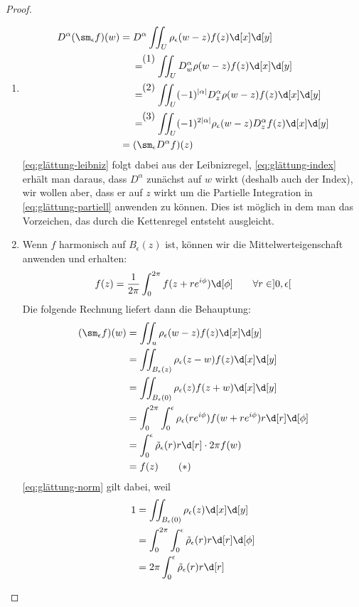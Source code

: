 \begin{proof}
  \begin{enumerate}
  \item
    \begin{align*}
      D^\alpha (\sm_\epsilon f)(w) & = D^\alpha \iint_U \rho_\epsilon(w
      - z) f(z) \d[x] \d[y] \\
      & \stackrel{\tag{1}}{=} \iint_U D_w^\alpha \rho(w - z) f(z)
      \d[x] \d[y] \label{eq:glättung-leibniz}\\
      & \stackrel{\tag{2}}{=} \iint_U (-1)^{|\alpha|} D_z^\alpha
      \rho(w-z) f(z) \d[x] \d[y] \label{eq:glättung-index}\\
      & \stackrel{\tag{3}}{=} \iint_U (-1)^{2|\alpha|}
      \rho_\epsilon(w-z) D^\alpha_z f(z)
      \d[x]\d[y] \label{eq:glättung-partiell}\\
      & = (\sm_\epsilon D^\alpha f)(z)
    \end{align*}
    \eqref{eq:glättung-leibniz} folgt dabei aus der Leibnizregel,
    \eqref{eq:glättung-index} erhält man daraus, dass $D^\alpha$
    zunächst auf $w$ wirkt (deshalb auch der Index), wir wollen aber,
    dass er auf $z$ wirkt um die Partielle Integration in
    \eqref{eq:glättung-partiell} anwenden zu können. Dies ist möglich
    in dem man das Vorzeichen, das durch die Kettenregel entsteht
    ausgleicht.
  \item Wenn $f$ harmonisch auf $B_\epsilon(z)$ ist, können wir die
    Mittelwerteigenschaft anwenden und erhalten:
    \[
    f(z) = \frac{1}{2\pi} \int_0^{2\pi}f(z + re^{i\phi}) \d[\phi]
    \qquad \forall r \in ]0, \epsilon[
    \]
    Die folgende Rechnung liefert dann die Behauptung:
    \begin{align*}
      (\sm_\epsilon f)(w) & = \iint_u \rho_\epsilon(w- z) f(z)
      \d[x]\d[y] \\
      & = \iint_{B_\epsilon(z)} \rho_\epsilon(z -w ) f(z) \d[x]\d[y]
      \\
      & = \iint_{B_\epsilon(0)} \rho_\epsilon(z) f(z + w) \d[x]\d[y]
      \\
      & = \int_0^{2\pi} \int_0^\epsilon \rho_\epsilon(re^{i\phi}) f(w +
       re^{i\phi}) r \d[r] \d[\phi] \\
      & = \int_0^\epsilon \tilde \rho_\epsilon(r) r\d[r] \cdot 2 \pi f(w) \\
      & = f(z) \label{eq:glättung-norm} \tag{$\ast$}
    \end{align*}
    \eqref{eq:glättung-norm} gilt dabei, weil
    \begin{align*}
      1 & = \iint_{B_\epsilon(0)}\rho_\epsilon(z) \d[x]\d[y] \\
      & = \int_0^{2\pi}\int_0^{\epsilon} \tilde \rho_\epsilon(r) r
      \d[r] \d[\phi] \\
      & = 2 \pi \int_0^\epsilon \tilde \rho_\epsilon(r) r \d[r]
    \end{align*}
  \end{enumerate}
\end{proof}

